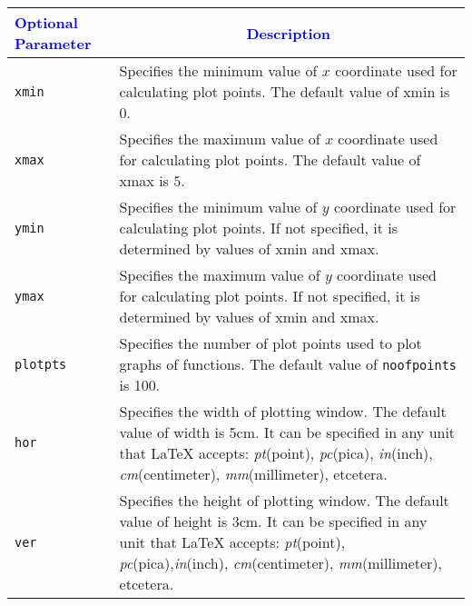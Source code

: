 \documentclass{article}
\begin{document}
\begin{center}
\begin{longtable}{lm{11.3cm}}
\toprule
\multicolumn{1}{l}{\textcolor{blue}{Optional Parameter}} & \multicolumn{1}{c}{\textcolor{blue}{Description}}  \\
\toprule
\begin{lstlisting}[caption={[]}]
xmin
\end{lstlisting}
 & Specifies the minimum value of \(x \) coordinate used for calculating plot points. The default value of xmin is \(0 \). \\
\midrule
\begin{lstlisting}[caption={[]}]
xmax
\end{lstlisting}
 & Specifies the maximum value of \(x \) coordinate used for calculating plot points.  The default value of xmax is \(5 \).\\
\midrule
\begin{lstlisting}[caption={[]}]
ymin
\end{lstlisting}
 & Specifies the minimum value of \(y \) coordinate used for calculating plot points. If not specified, it is determined by values of xmin and xmax. \\
\midrule
\begin{lstlisting}[caption={[]}]
ymax
\end{lstlisting}
 & Specifies the maximum value of \(y \) coordinate used for calculating plot points.  If not specified, it is determined by values of xmin and xmax.\\
\midrule
\begin{lstlisting}[caption={[]}]
plotpts
\end{lstlisting}
 & Specifies the number of plot points used to plot graphs of functions. The default value of \texttt{noofpoints} is 100.\\
\midrule
\begin{lstlisting}[caption={[]}]
hor
\end{lstlisting}
 & Specifies the width of plotting window. The default value of width is 5cm. It can be specified in any unit that LaTeX accepts: \emph{pt}(point), \emph{pc}(pica), \emph{in}(inch), \emph{cm}(centimeter), \emph{mm}(millimeter), etcetera.\\
\midrule
\begin{lstlisting}[caption={[]}]
ver
\end{lstlisting}
 & Specifies the height of plotting window. The default value of height is 3cm. It can be specified in any unit that LaTeX accepts: \emph{pt}(point), \emph{pc}(pica),\emph{in}(inch), \emph{cm}(centimeter), \emph{mm}(millimeter), etcetera.\\

\end{longtable}
\end{center}
\end{document}
